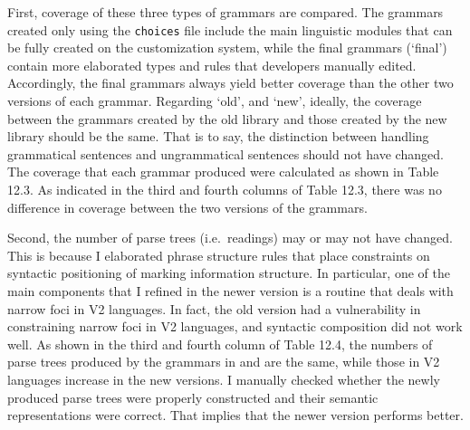 First, coverage of these three types of grammars are compared.  The
grammars created only using the \texttt{choices} file include the main
linguistic modules that can be fully created on the \lingo
{} customization system, while the final grammars
(`final') contain more elaborated types and rules that developers
manually edited. Accordingly, the final grammars always yield better
coverage than the other two versions of each grammar. Regarding `old',
and `new', ideally, the coverage between the grammars created by the
old library and those created by the new library should be the same.
That is to say, the distinction between handling grammatical sentences
and ungrammatical sentences should not have changed.  The coverage
that each grammar produced were calculated as shown in Table 12.3.  As
indicated in the third and fourth columns of Table 12.3, there was no
difference in coverage between the two versions of the grammars.


Second, the number of parse trees (i.e.\ readings) may or may not have
changed. This is because I elaborated phrase structure rules that
place constraints on syntactic positioning of marking information
structure. In particular, one of the main
components that I refined in the newer version is a routine that deals
with narrow foci in V2 languages. In fact, the old version had a
vulnerability in constraining narrow foci in V2 languages, and
syntactic composition did not work well.  As shown in the third and
fourth column of Table 12.4, the numbers of parse trees produced by
the grammars in  and  are the same, while
those in V2 languages increase in the new versions. I manually checked
whether the newly produced parse trees were properly constructed and
their semantic representations were correct.  That implies that the
newer version performs better.



